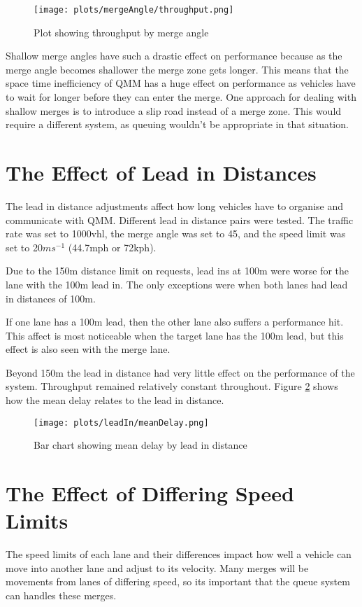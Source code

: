\begin{figure}[htb]
\centering
\texttt{[image: plots/mergeAngle/throughput.png]}
\caption{Plot showing throughput by merge angle}
\label{fig:throughputMergeAngle}
\end{figure}

Shallow merge angles have such a drastic effect on performance because as the merge angle becomes shallower the merge zone gets longer. This means that the space time inefficiency of QMM has a huge effect on performance as vehicles have to wait for longer before they can enter the merge. One approach for dealing with shallow merges is to introduce a slip road instead of a merge zone. This would require a different system, as queuing wouldn't be appropriate in that situation.

\section{The Effect of Lead in Distances}
\label{sec:The Effect of Lead in Distances}
The lead in distance adjustments affect how long vehicles have to organise and communicate with QMM. Different lead in distance pairs were tested. The traffic rate was set to 1000\si{vhl}, the merge angle was set to 45\degree, and the speed limit was set to 20$\si{ms^{-1}}$ (44.7\si{mph} or 72\si{kph}).

Due to the 150\si{m} distance limit on requests, lead ins at 100\si{m} were worse for the lane with the 100\si{m} lead in. The only exceptions were when both lanes had lead in distances of 100\si{m}.

If one lane has a 100\si{m} lead, then the other lane also suffers a performance hit. This affect is most noticeable when the target lane has the 100\si{m} lead, but this effect is also seen with the merge lane. 

Beyond 150\si{m} the lead in distance had very little effect on the performance of the system. Throughput remained relatively constant throughout. Figure \ref{fig:meanDelayLeadIn} shows how the mean delay relates to the lead in distance.

\begin{figure}[p]
\centerline{
	\texttt{[image: plots/leadIn/meanDelay.png]}
}
\caption{Bar chart showing mean delay by lead in distance}
\label{fig:meanDelayLeadIn}
\end{figure}

\section{The Effect of Differing Speed Limits}
\label{sec:The Effect of Differing Speed Limits}
The speed limits of each lane and their differences impact how well a vehicle can move into another lane and adjust to its velocity. Many merges will be movements from lanes of differing speed, so its important that the queue system can handles these merges.

